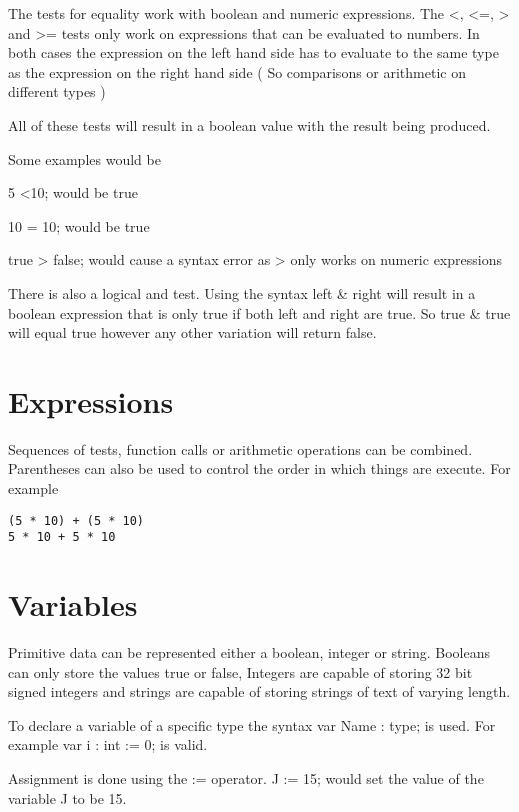 \documentclass[]{final_report}
\begin{document}
The tests for equality work with boolean and numeric expressions. The \textless, \textless=, \textgreater \vspace{1pt} and \textgreater= tests only work on expressions that can be evaluated to numbers. In both cases the expression on the left hand side has to evaluate to the same type as the expression on the right hand side ( So comparisons or arithmetic on different types  )

All of these tests will result in a boolean value with the result being produced.

Some examples would be

5 \textless 10; would be true

10 = 10; would be true

true \textgreater \vspace{1pt} false; would cause a syntax error as \textgreater \vspace{1pt} only works on numeric expressions

There is also a logical and test. Using the syntax left \& right will result in a boolean expression that is only true if both left and right are true. So true \& true will equal true however any other variation will return false. 

\section{Expressions}

Sequences of tests, function calls or arithmetic operations can be combined. Parentheses can also be used to control the order in which things are execute. For example

\begin{verbatim}
(5 * 10) + (5 * 10)
5 * 10 + 5 * 10
\end{verbatim}

\section{Variables}

Primitive data can be represented either a boolean, integer or string. Booleans can only store the values true or false, Integers are capable of storing 32 bit signed integers and strings are capable of storing strings of text of varying length.

To declare a variable of a specific type the syntax var Name : type; is used. For example var i : int := 0; is valid.

Assignment is done using the := operator. J := 15; would set the value of the variable J to be 15.
\end{document}
